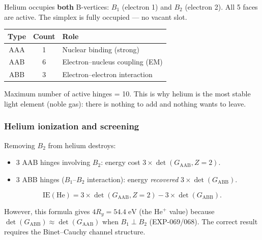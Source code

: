 \documentclass[12pt]{article}
\theoremstyle{remark}
\theoremstyle{definition}
\begin{document}
Helium occupies \textbf{both} B-vertices: $B_1$ (electron 1) and $B_2$ (electron 2). All 5 faces are active. The simplex is fully occupied --- no vacant slot.

\begin{center}
\begin{tabular}{ccl}
\hline
Type & Count & Role \\
\hline
AAA & 1 & Nuclear binding (strong) \\
AAB & 6 & Electron--nucleus coupling (EM) \\
ABB & 3 & Electron--electron interaction \\
\hline
\end{tabular}
\end{center}

Maximum number of active hinges = 10. This is why helium is the most stable light element (noble gas): there is nothing to add and nothing wants to leave.

\subsubsection{Helium ionization and screening}

Removing $B_2$ from helium destroys:
\begin{itemize}
\item 3 AAB hinges involving $B_2$: energy cost $3 \times \det(G_{\text{AAB}}, Z\!=\!2)$.
\item 3 ABB hinges ($B_1$--$B_2$ interaction): energy \emph{recovered} $3 \times \det(G_{\text{ABB}})$.
\end{itemize}

\begin{equation}
\text{IE}(\text{He}) = 3 \times \det(G_{\text{AAB}}, Z\!=\!2) - 3 \times \det(G_{\text{ABB}}).
\end{equation}

However, this formula gives $4R_y = 54.4\;\text{eV}$ (the He$^+$ value) because $\det(G_\text{ABB}) \approx \det(G_\text{AAB})$ when $B_1 \perp B_2$ (EXP-069/068).  The correct result requires the Binet--Cauchy channel structure.
\end{document}
